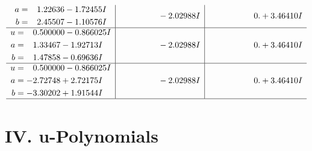 \documentclass[1p]{elsarticle_modified}
\theoremstyle{definition}
\begin{document}
$$\begin{array}{c|c|c}
\begin{aligned}
a &= \phantom{-}1.22636 - 1.72455 I \\
b &= \phantom{-}2.45507 - 1.10576 I\end{aligned}
 & \phantom{-0.000000 } -2.02988 I & \phantom{-0.000000 -}0. + 3.46410 I \\ \hline\begin{aligned}
u &= \phantom{-}0.500000 - 0.866025 I \\
a &= \phantom{-}1.33467 - 1.92713 I \\
b &= \phantom{-}1.47858 - 0.69636 I\end{aligned}
 & \phantom{-0.000000 } -2.02988 I & \phantom{-0.000000 -}0. + 3.46410 I \\ \hline\begin{aligned}
u &= \phantom{-}0.500000 - 0.866025 I \\
a &= -2.72748 + 2.72175 I \\
b &= -3.30202 + 1.91544 I\end{aligned}
 & \phantom{-0.000000 } -2.02988 I & \phantom{-0.000000 -}0. + 3.46410 I\\
 \hline 
 \end{array}$$\newpage
\newpage\renewcommand{\arraystretch}{1}
\centering \section*{ IV. u-Polynomials}
\end{document}
